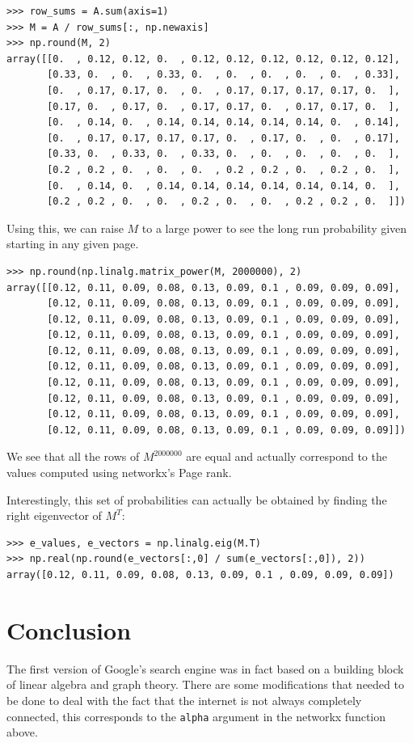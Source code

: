 \documentclass[a4paper]{article}
\begin{document}
\begin{verbatim}
>>> row_sums = A.sum(axis=1)
>>> M = A / row_sums[:, np.newaxis]
>>> np.round(M, 2)
array([[0.  , 0.12, 0.12, 0.  , 0.12, 0.12, 0.12, 0.12, 0.12, 0.12],
       [0.33, 0.  , 0.  , 0.33, 0.  , 0.  , 0.  , 0.  , 0.  , 0.33],
       [0.  , 0.17, 0.17, 0.  , 0.  , 0.17, 0.17, 0.17, 0.17, 0.  ],
       [0.17, 0.  , 0.17, 0.  , 0.17, 0.17, 0.  , 0.17, 0.17, 0.  ],
       [0.  , 0.14, 0.  , 0.14, 0.14, 0.14, 0.14, 0.14, 0.  , 0.14],
       [0.  , 0.17, 0.17, 0.17, 0.17, 0.  , 0.17, 0.  , 0.  , 0.17],
       [0.33, 0.  , 0.33, 0.  , 0.33, 0.  , 0.  , 0.  , 0.  , 0.  ],
       [0.2 , 0.2 , 0.  , 0.  , 0.  , 0.2 , 0.2 , 0.  , 0.2 , 0.  ],
       [0.  , 0.14, 0.  , 0.14, 0.14, 0.14, 0.14, 0.14, 0.14, 0.  ],
       [0.2 , 0.2 , 0.  , 0.  , 0.2 , 0.  , 0.  , 0.2 , 0.2 , 0.  ]])
\end{verbatim}

Using this, we can raise \(M\) to a large power to see the long run probability
given starting in any given page.

\begin{verbatim}
>>> np.round(np.linalg.matrix_power(M, 2000000), 2)
array([[0.12, 0.11, 0.09, 0.08, 0.13, 0.09, 0.1 , 0.09, 0.09, 0.09],
       [0.12, 0.11, 0.09, 0.08, 0.13, 0.09, 0.1 , 0.09, 0.09, 0.09],
       [0.12, 0.11, 0.09, 0.08, 0.13, 0.09, 0.1 , 0.09, 0.09, 0.09],
       [0.12, 0.11, 0.09, 0.08, 0.13, 0.09, 0.1 , 0.09, 0.09, 0.09],
       [0.12, 0.11, 0.09, 0.08, 0.13, 0.09, 0.1 , 0.09, 0.09, 0.09],
       [0.12, 0.11, 0.09, 0.08, 0.13, 0.09, 0.1 , 0.09, 0.09, 0.09],
       [0.12, 0.11, 0.09, 0.08, 0.13, 0.09, 0.1 , 0.09, 0.09, 0.09],
       [0.12, 0.11, 0.09, 0.08, 0.13, 0.09, 0.1 , 0.09, 0.09, 0.09],
       [0.12, 0.11, 0.09, 0.08, 0.13, 0.09, 0.1 , 0.09, 0.09, 0.09],
       [0.12, 0.11, 0.09, 0.08, 0.13, 0.09, 0.1 , 0.09, 0.09, 0.09]])
\end{verbatim}

We see that all the rows of \(M ^ {2000000}\) are equal and actually correspond to
the values computed using networkx's Page rank.

Interestingly, this set of probabilities can actually be obtained by finding the
right eigenvector of \(M^{T}\):

\begin{verbatim}
>>> e_values, e_vectors = np.linalg.eig(M.T)
>>> np.real(np.round(e_vectors[:,0] / sum(e_vectors[:,0]), 2))
array([0.12, 0.11, 0.09, 0.08, 0.13, 0.09, 0.1 , 0.09, 0.09, 0.09])
\end{verbatim}

\section{Conclusion}

The first version of Google's search engine was in fact based on a building
block of linear algebra and graph theory. There are some modifications that
needed to be done to deal with the fact that the internet is not always
completely connected, this corresponds to the \texttt{alpha} argument in the
networkx function above.



\end{document}
